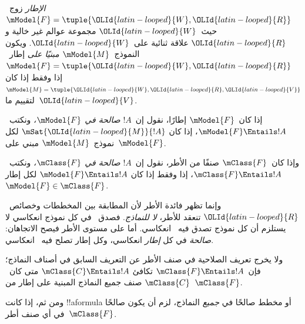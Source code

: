 \documentclass[../../../include/open-logic-section]{subfiles}
\begin{document}


\begin{defn}
  \emph{الإطار} زوج~$\mModel{F} = \tuple{{\OLId{latin-looped}{W}},{\OLId{latin-looped}{R}}}$ حيث~${\OLId{latin-looped}{W}}$ مجموعة عوالم
  غير خالية و${\OLId{latin-looped}{R}}$ علاقة ثنائية على~${\OLId{latin-looped}{W}}$. ويكون النموذج~$\mModel{M}$
  \emph{مبنيًا على} إطار~$\mModel{F} = \tuple{{\OLId{latin-looped}{W}},{\OLId{latin-looped}{R}}}$ إذا وفقط إذا كان
  $\mModel{M} = \tuple{{\OLId{latin-looped}{W}}, {\OLId{latin-looped}{R}}, {\OLId{latin-looped}{V}}}$ لتقييم ما~${\OLId{latin-looped}{V}}$.
\end{defn}

\begin{defn}
  إذا كان~$\mModel{F}$ إطارًا، نقول إن~$!A$ \emph{صالحة في
    $\mModel{F}$،} ونكتب~$\mModel{F} \Entails !A$، إذا كان
  $\mSat{{\OLId{latin-looped}{M}}}{!A}$ لكل نموذج~$\mModel{M}$ مبني على~$\mModel{F}$.

  وإذا كان~$\mClass{F}$ صنفًا من الأطر، نقول إن~$!A$ \emph{صالحة في
    $\mClass{F}$،} ونكتب~$\mClass{F} \Entails !A$، إذا وفقط إذا كان
  $\mModel{F} \Entails !A$ لكل إطار~$\mModel{F} \in \mClass{F}$.
\end{defn}

وإنما تظهر فائدة الأطر لأن المطابقة بين المخططات وخصائص~${\OLId{latin-looped}{R}}$
تنعقد للأطر، \emph{لا للنماذج}. فصدق~ في كل نموذج انعكاسي
لا يستلزم أن كل نموذج تصدق فيه~ انعكاسي.
أما على مستوى الأطر فيصح الاتجاهان:  \emph{صالحة} في كل
\emph{إطار} انعكاسي، وكل إطار تصلح فيه~ انعكاسي.

\begin{rem}
ولا يخرج تعريف الصلاحية في صنف الأطر عن التعريف السابق في أصناف
النماذج؛ فإن~$\mClass{F} \Entails !A$ تكافئ
$\mClass{C} \Entails !A$ متى كان~$\mClass{C}$ صنف جميع النماذج
المبنية على إطار من~$\mClass{F}$.

ومن ثم، إذا كانت !!a{formula} أو مخطط صالحًا في \emph{جميع}
النماذج، لزم أن يكون صالحًا في أي صنف أطر~$\mClass{F}$.
\end{rem}
\end{document}
